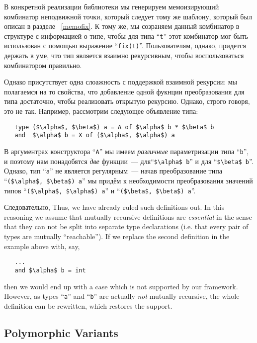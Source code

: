 В конкретной реализации библиотеки мы генерируем мемоизирующий комбинатор неподвижной точки, который следует тому же шаблону, который был описан в разделе ~\ref{memofix}. К тому же, мы созраняем данный комбинатор в структуре с информацией о типе, чтобы для 
типа ``\lstinline{t}'' этот комбинатор мог быть использован с помощью выражение 
``\lstinline{fix(t)}''. Пользователям, однако, придется держать в уме, что тип является взаимно рекурсивным, чтобы воспользоваться комбинатором правильно.

Однако присутствует одна слоажность с поддержкой взаимной рекурсии: мы полагаемся на то свойства, что добавление одной фукнции преобразования для типа  достаточно, чтобы реализовать открытую рекурсию. Однако, строго говоря, это не так. Например, рассмотрим следующее объявление типа:

\begin{lstlisting}
   type ($\alpha$, $\beta$) a = A of $\alpha$ b * $\beta$ b
   and  $\alpha$ b = X of ($\alpha$, $\alpha$) a
\end{lstlisting}

В аргументрах конструктора ``\lstinline{A}'' мы имеем \emph{различные} параметризации типа ``\lstinline{b}'', и поэтому нам понадобятся \emph{две} функции~--- для``\lstinline{$\alpha$ b}'' и для ``\lstinline{$\beta$ b}''. Однако, тип ``\lstinline{a}'' не является регулярным~--- начав преобразование типа ``\lstinline{($\alpha$, $\beta$) a}'' мы придём к необходимости преобразования значений типов ``\lstinline{($\alpha$, $\alpha$) a}'' и ``\lstinline{($\beta$, $\beta$) a}''.

Следовательно, 
Thus, we have already ruled such definitions out. In this reasoning we assume that mutually recursive definitions are \emph{essential} in the sense that they
can not be split into separate type declarations (i.e. that every pair of types are mutually ``reachable''). If we replace the second definition in the
example above with, say,

\begin{lstlisting}
   ...
   and $\alpha$ b = int
\end{lstlisting}

then we would end up with a case which is not supported by our framework. However, as types ``\lstinline{a}'' and ``\lstinline{b}'' are actually \emph{not}
mutually recursive, the whole definition can be rewritten, which restores the support.

\subsection{Polymorphic Variants}
\label{pv}

